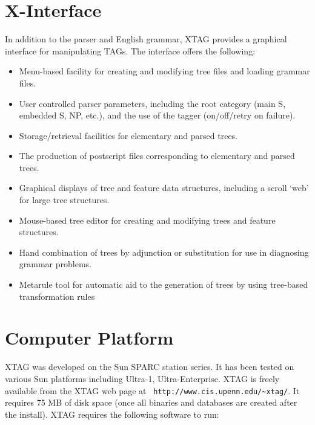 {\section{X-Interface}

In addition to the parser and English grammar, XTAG provides a graphical
interface for manipulating TAGs.  The interface offers the following:

\begin{itemize}

\item Menu-based facility for creating and modifying tree files and 
loading grammar files.

\item User controlled parser parameters, including the root
category (main S, embedded S, NP, etc.), and the use of the tagger
(on/off/retry on failure).

\item Storage/retrieval facilities for elementary and parsed trees.

\item The production of postscript files corresponding to elementary
and parsed trees.

\item Graphical displays of tree and feature data structures,
including a scroll `web' for large tree structures.

\item Mouse-based tree editor for creating and modifying trees and
feature structures.

\item Hand combination of trees by adjunction or substitution for use
in diagnosing grammar problems.

\item Metarule tool for automatic aid to the generation of trees by using 
tree-based transformation rules
 
\end{itemize}


\section{Computer Platform}


XTAG was developed on the Sun SPARC station series. It has been tested
on various Sun platforms including Ultra-1, Ultra-Enterprise. XTAG is
freely available from the XTAG web page at {\tt
  http://www.cis.upenn.edu/\~{}xtag/}. It requires 75 MB of disk space
(once all binaries and databases are created after the install). XTAG
requires the following software to run:

}
